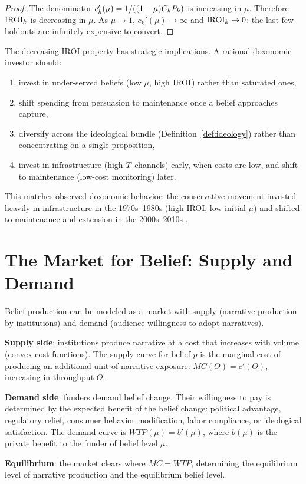 \begin{proof}
The denominator $c_k'(\mu) = 1/((1-\mu)C_{k}P_{k})$ is increasing in $\mu$.
Therefore $\mathrm{IROI}_k$ is decreasing in $\mu$.
As $\mu \to 1$, $c_k'(\mu) \to \infty$ and $\mathrm{IROI}_k \to 0$: the last few holdouts are infinitely expensive to convert.
\end{proof}

\begin{remark}
\label{rem:iroi-strategy}
The decreasing-IROI property has strategic implications.
A rational doxonomic investor should:
\begin{enumerate}[nosep]
  \item invest in under-served beliefs (low $\mu$, high $\mathrm{IROI}$) rather than saturated ones,
  \item shift spending from persuasion to maintenance once a belief approaches capture,
  \item diversify across the ideological bundle (Definition~\ref{def:ideology}) rather than concentrating on a single proposition,
  \item invest in infrastructure (high-$T_{}$ channels) early, when costs are low, and shift to maintenance (low-cost monitoring) later.
\end{enumerate}
This matches observed doxonomic behavior: the conservative movement invested heavily in infrastructure in the 1970s--1980s (high IROI, low initial $\mu$) and shifted to maintenance and extension in the 2000s--2010s \autocite{mayer2016}.
\end{remark}


\section{The Market for Belief: Supply and Demand}
\label{sec:ch10-market}

Belief production can be modeled as a market with supply (narrative production by institutions) and demand (audience willingness to adopt narratives).

\begin{model}
\label{mod:doxonomic-market}
\textbf{Supply side}: institutions produce narrative at a cost that increases with volume (convex cost functions).
The supply curve for belief $p$ is the marginal cost of producing an additional unit of narrative exposure: $MC(\Theta) = c'(\Theta)$, increasing in throughput $\Theta$.

\textbf{Demand side}: funders demand belief change.
Their willingness to pay is determined by the expected benefit of the belief change: political advantage, regulatory relief, consumer behavior modification, labor compliance, or ideological satisfaction.
The demand curve is $WTP(\mu) = b'(\mu)$, where $b(\mu)$ is the private benefit to the funder of belief level $\mu$.

\textbf{Equilibrium}: the market clears where $MC = WTP$, determining the equilibrium level of narrative production and the equilibrium belief level.
\end{model}

